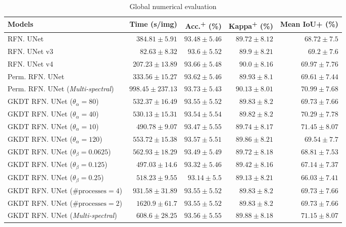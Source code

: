 \documentclass[journal]{IEEEtran}
\begin{document}
\begin{table*}
  \centering
  \caption{Global numerical evaluation}
  \label{tab:globaleval}
  \begin{tabular}{lrrrr}
    \toprule
    \textbf{Models} & \textbf{Time} (s/img) & \textbf{Acc.}\textsuperscript{+} (\%) & \textbf{Kappa}\textsuperscript{+} (\%) & \textbf{Mean IoU}\textbf{+} (\%) \\
    \midrule
    RFN. UNet \cite{jiao2020refined} & $384.81 \pm 5.91$ & $93.48 \pm 5.46$ & $89.72 \pm 8.12$ & $68.72 \pm 7.5$ \\
    RFN. UNet v3 \cite{jiao2021refined} & $82.63 \pm 8.32$ & $93.6 \pm 5.52$ & $89.9 \pm 8.21$ & $69.2 \pm 7.6$ \\
    RFN. UNet v4 \cite{jiao2022refined} & $207.23 \pm 13.89$ &	$93.66 \pm 5.48$ & $90.0 \pm 8.16$ & $69.97 \pm 7.76$ \\
    Perm. RFN. UNet \cite{} & $333.56 \pm 15.27$ & $93.62 \pm 5.46$ & $89.93 \pm 8.1$ & $69.61 \pm 7.44$ \\
    Perm. RFN. UNet (\textit{Multi-spectral}) \cite{} & $998.45 \pm 237.13$ & $93.73 \pm 5.43$ & $90.13 \pm 8.01$ & $70.99 \pm 7.68$ \\
    GKDT RFN. UNet ($\theta_{\alpha} = 80$) & $532.37 \pm 16.49$ & $93.55 \pm 5.52$ & $89.83 \pm 8.2$ & $69.73 \pm 7.66$ \\
    GKDT RFN. UNet ($\theta_{\alpha} = 40$) & $530.13 \pm 15.31$ & $93.54 \pm 5.54$ & $89.82 \pm 8.2$ & $70.29 \pm 7.78$ \\
    GKDT RFN. UNet ($\theta_{\alpha} = 10$) & $490.78 \pm 9.07$ & $93.47 \pm 5.55$ & $89.74 \pm 8.17$ & $71.45 \pm 8.07$ \\
    GKDT RFN. UNet ($\theta_{\alpha} = 120$) & $553.72 \pm 15.38$ & $93.57 \pm 5.51$ & $89.86 \pm 8.21$ & $69.54 \pm 7.7$ \\
    GKDT RFN. UNet ($\theta_{\beta} = 0.0625$) & $562.93 \pm 18.29$ & $93.49 \pm 5.49$ & $89.72 \pm 8.18$ & $68.81 \pm 7.53$ \\
    GKDT RFN. UNet ($\theta_{\beta} = 0.125$) & $497.03 \pm 14.6$ & $93.32 \pm 5.46$ & $89.42 \pm 8.16$ & $67.14 \pm 7.37$ \\
    GKDT RFN. UNet ($\theta_{\beta} = 0.25$) & $518.23 \pm 9.55$ & $93.14 \pm 5.5$ & $89.13 \pm 8.21$ & $66.03 \pm 7.41$ \\
    GKDT RFN. UNet ($\text{\#processes} = 4$) & $931.58 \pm 31.89$ & $93.55 \pm 5.52$ & $89.83 \pm 8.2$ & $69.73 \pm 7.66$ \\
    GKDT RFN. UNet ($\text{\#processes} = 2$) & $1620.9 \pm 61.7$ & $93.55 \pm 5.52$ & $89.83 \pm 8.2$ & $69.73 \pm 7.66$ \\
    GKDT RFN. UNet (\textit{Multi-spectral}) & $608.6 \pm 28.25$ & $93.56 \pm 5.55$ & $89.88 \pm 8.18$ & $71.15 \pm 8.07$ \\
    \bottomrule
  \end{tabular}
\end{table*}
\end{document}
